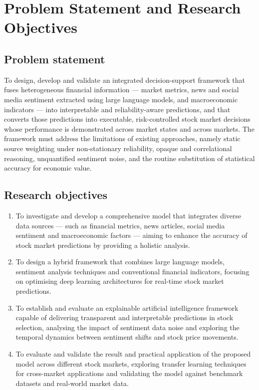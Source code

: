 \section{Problem Statement and Research Objectives}

\subsection{Problem statement}

To design, develop and validate an integrated decision-support framework that fuses
heterogeneous financial information --- market metrics, news and social media sentiment
extracted using large language models, and macroeconomic indicators --- into interpretable and
reliability-aware predictions, and that converts those predictions into executable,
risk-controlled stock market decisions whose performance is demonstrated across market states
and across markets. The framework must address the limitations of existing approaches, namely
static source weighting under non-stationary reliability, opaque and correlational reasoning,
unquantified sentiment noise, and the routine substitution of statistical accuracy for economic
value.

\subsection{Research objectives}

\begin{enumerate}[label=\textbf{RO\arabic*.},leftmargin=2.8em]
\item To investigate and develop a comprehensive model that integrates diverse data sources ---
such as financial metrics, news articles, social media sentiment and macroeconomic factors ---
aiming to enhance the accuracy of stock market predictions by providing a holistic analysis.

\item To design a hybrid framework that combines large language models, sentiment analysis
techniques and conventional financial indicators, focusing on optimising deep learning
architectures for real-time stock market predictions.

\item To establish and evaluate an explainable artificial intelligence framework capable of
delivering transparent and interpretable predictions in stock selection, analysing the impact of
sentiment data noise and exploring the temporal dynamics between sentiment shifts and stock
price movements.

\item To evaluate and validate the result and practical application of the proposed model across
different stock markets, exploring transfer learning techniques for cross-market applications
and validating the model against benchmark datasets and real-world market data.
\end{enumerate}

